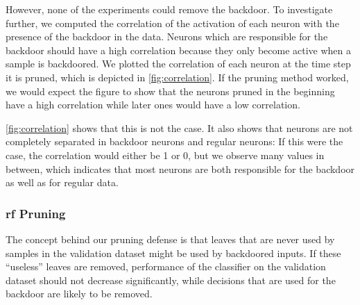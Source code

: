 \documentclass[10pt,sigconf,letterpaper,dvipsnames]{acmart}
\newcommand\note[2]{{\color{#1}#2}}
\newcommand\todo[1]{{\note{red}{TODO: #1}}}
\begin{document}
However, none of the experiments could remove the backdoor.
To investigate further, we computed the correlation of the activation of each neuron with the presence of the backdoor in the data. Neurons which are responsible for the backdoor should have a high correlation because they only become active when a sample is backdoored. We  plotted the correlation of each neuron at the time step it is pruned, which is depicted in \autoref{fig:correlation}. If the pruning method worked, we would expect the figure to
show that the neurons pruned in the beginning have a high correlation while later ones would have a low correlation.

\autoref{fig:correlation} shows that this is not the case. It also shows that neurons are not completely separated in backdoor neurons and regular neurons: If this were the case, the correlation would either be 1 or 0, but we observe many values in between, which indicates that most neurons are both responsible for the backdoor as well as for regular data.

\subsubsection{\gls{rf} Pruning}

The concept behind our pruning defense is that leaves that are never used by samples in the validation dataset might be used by backdoored inputs. If these ``useless'' leaves are removed, performance of the classifier on the validation dataset should not decrease
significantly,
while decisions that are used for the backdoor are likely to be removed.
\end{document}
